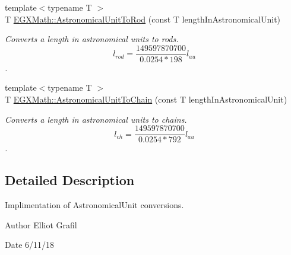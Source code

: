 \begin{DoxyCompactItemize}
{\footnotesize template$<$typename T $>$ }\\T \mbox{\hyperlink{group___e_g_x_math-_conversions-_length_conversions-_astronomical-_astronomical_unit-_surveyors_gab8120fd6b46c2eb849317bb948254c92}{E\+G\+X\+Math\+::\+Astronomical\+Unit\+To\+Rod}} (const T length\+In\+Astronomical\+Unit)
\begin{DoxyCompactList}\small\item\em Converts a length in astronomical units to rods. \[ l_{rod}= \frac{149597870700}{0.0254 * 198} l_{au} \]. \end{DoxyCompactList}\item 
{\footnotesize template$<$typename T $>$ }\\T \mbox{\hyperlink{group___e_g_x_math-_conversions-_length_conversions-_astronomical-_astronomical_unit-_surveyors_gaaceebc92930ed7feb36522f2dad6dffd}{E\+G\+X\+Math\+::\+Astronomical\+Unit\+To\+Chain}} (const T length\+In\+Astronomical\+Unit)
\begin{DoxyCompactList}\small\item\em Converts a length in astronomical units to chains. \[ l_{ch}= \frac{149597870700}{0.0254 * 792} l_{au} \]. \end{DoxyCompactList}\end{DoxyCompactItemize}


\subsection{Detailed Description}
Implimentation of Astronomical\+Unit conversions. 

\begin{DoxyAuthor}{Author}
Elliot Grafil 
\end{DoxyAuthor}
\begin{DoxyDate}{Date}
6/11/18 
\end{DoxyDate}
